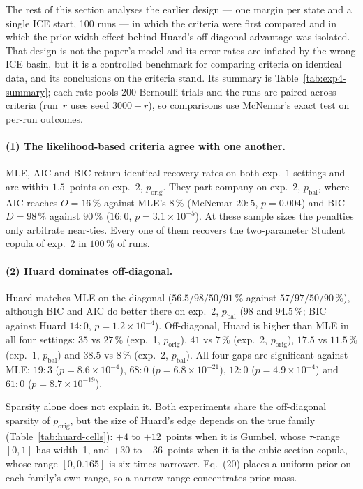 \documentclass[11pt,a4paper]{article}
\newcommand{\porig}{p_{\text{orig}}}
\newcommand{\pbal}{p_{\text{bal}}}
\begin{document}
The rest of this section analyses the earlier design --- one margin per state
and a single ICE start, 100 runs --- in which the criteria were first compared
and in which the prior-width effect behind Huard's off-diagonal advantage
was isolated. That design is not the paper's model and its error rates are
inflated by the wrong ICE basin, but it is a controlled benchmark for
comparing criteria on identical data, and its conclusions on the criteria
stand. Its summary is Table~\ref{tab:exp4-summary}; each rate pools 200
Bernoulli trials and the runs are paired across criteria (run~$r$ uses seed
$3000+r$), so comparisons use McNemar's exact test on per-run outcomes.

{\setlength{\tabcolsep}{2.2pt}}

\paragraph{(1) The likelihood-based criteria agree with one another.} MLE,
AIC and BIC return identical recovery rates on both exp.~1 settings and are
within $1.5$~points on exp.~2, $\porig$. They part company on exp.~2, $\pbal$,
where AIC reaches $O=16\,\%$ against MLE's $8\,\%$ (McNemar $20{:}5$,
$p=0.004$) and BIC $D=98\,\%$ against $90\,\%$ ($16{:}0$,
$p=3.1\times10^{-5}$). At these sample sizes the penalties only arbitrate
near-ties. Every one of them recovers the two-parameter Student copula of
exp.~2 in $100\,\%$ of runs.

\paragraph{(2) Huard dominates off-diagonal.} Huard matches MLE on the
diagonal ($56.5/98/50/91\,\%$ against $57/97/50/90\,\%$), although BIC and
AIC do better there on exp.~2, $\pbal$ ($98$ and $94.5\,\%$; BIC against
Huard $14{:}0$, $p=1.2\times10^{-4}$). Off-diagonal, Huard is higher than MLE
in all four settings: $35$ vs $27\,\%$ (exp.~1, $\porig$), $41$ vs $7\,\%$
(exp.~2, $\porig$), $17.5$ vs $11.5\,\%$ (exp.~1, $\pbal$) and $38.5$ vs
$8\,\%$ (exp.~2, $\pbal$). All four gaps are significant
against MLE: $19{:}3$ ($p=8.6\times10^{-4}$), $68{:}0$
($p=6.8\times10^{-21}$), $12{:}0$ ($p=4.9\times10^{-4}$) and $61{:}0$
($p=8.7\times10^{-19}$).

Sparsity alone does not explain it. Both experiments share the off-diagonal
sparsity of $\porig$, but the size of Huard's edge depends on the true
family (Table~\ref{tab:huard-cells}): $+4$ to $+12$~points when it is Gumbel,
whose $\tau$-range $[0,1]$ has width~1, and $+30$ to $+36$~points when it is
the cubic-section copula, whose range $[0,0.165]$ is six times narrower.
Eq.~(20) places a uniform prior on each family's own range, so a narrow range
concentrates prior mass.
\end{document}
